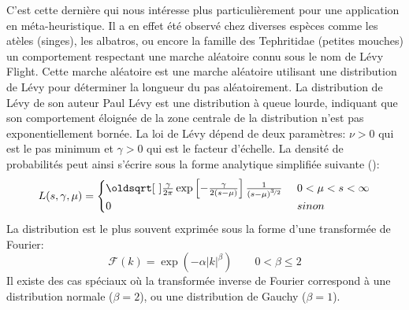 C’est cette dernière qui nous intéresse plus particulièrement pour une application en méta-heuristique.
Il a en effet été observé chez diverses espèces comme les atèles (singes), les albatros,
ou encore la famille des Tephritidae (petites mouches) un comportement respectant
une marche aléatoire connu sous le nom de Lévy Flight.
Cette marche aléatoire est une marche aléatoire utilisant une distribution de Lévy pour
déterminer la longueur du pas aléatoirement.
La distribution de Lévy de son auteur Paul Lévy est une distribution à queue lourde, indiquant que son comportement
éloignée de la zone centrale de la distribution n’est pas exponentiellement bornée.
La loi de Lévy dépend de deux paramètres: $\nu > 0$ qui est le pas minimum et $\gamma > 0$ qui est le
facteur d’échelle.
La densité de probabilités peut ainsi s’écrire sous la forme analytique simplifiée suivante (\cite{Yang201445}):
\begin{align}\label{eq:dens_levy}
    L(s, \gamma, \mu) = \begin{cases}
                            \sqrt{\frac{\gamma}{2\pi}} \exp\left[-\frac{\gamma}{2(s-\mu)}\right] \frac{1}{(s-\mu)^{\nicefrac{3}{2}}} &\ 0 < \mu < s < \infty \\
                            0                                                                                                        &\ sinon
                        \end{cases}
\end{align}
La distribution est le plus souvent exprimée sous la forme d’une transformée de Fourier:
\begin{equation}\label{eq:fourier_levy}
    \mathcal{F}(k) = \exp(-\alpha\mathopen{|}k\mathclose{|}^{\beta}) \qquad  0 < \beta \leq 2
\end{equation}
Il existe des cas spéciaux où la transformée inverse de Fourier correspond à une distribution
normale ($\beta = 2$), ou une distribution de Gauchy ($\beta = 1$).

